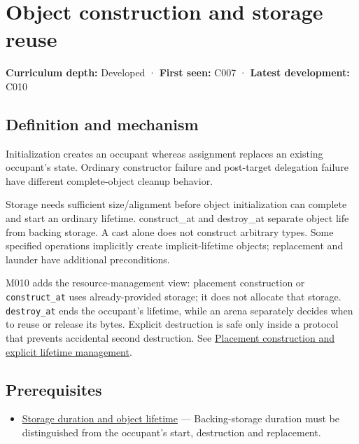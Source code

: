 \hypertarget{appendix-a82f9c438857}{}\label{referencestart:appendix-a82f9c438857}
\section{Object construction and storage reuse}\label{appendix-a82f9c438857-object-construction-and-storage-reuse}

\textbf{Curriculum depth:} Developed · \textbf{First seen:} C007 · \textbf{Latest development:} C010

\subsection{Definition and mechanism}\label{appendix-a82f9c438857-definition-and-mechanism}

Initialization creates an occupant whereas assignment replaces an existing occupant's state. Ordinary constructor failure and post-target delegation failure have different complete-object cleanup behavior.

Storage needs sufficient size/alignment before object initialization can complete and start an ordinary lifetime. construct\_at and destroy\_at separate object life from backing storage. A cast alone does not construct arbitrary types. Some specified operations implicitly create implicit-lifetime objects; replacement and launder have additional preconditions.

M010 adds the resource-management view: placement construction or \texttt{construct\_at} uses already-provided storage; it does not allocate that storage. \texttt{destroy\_at} ends the occupant's lifetime, while an arena separately decides when to reuse or release its bytes. Explicit destruction is safe only inside a protocol that prevents accidental second destruction. See \hyperref[appendix-f56c3e43fd4e]{Placement construction and explicit lifetime management}.

\subsection{Prerequisites}\label{appendix-a82f9c438857-prerequisites}

\begin{itemize}
\tightlist
\item
  \hyperref[appendix-0b104bcba06b]{Storage duration and object lifetime} --- Backing-storage duration must be distinguished from the occupant's start, destruction and replacement.
\end{itemize}

